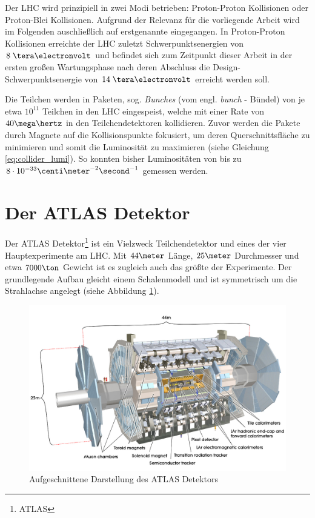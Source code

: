 Der \ac{LHC} wird prinzipiell in zwei Modi betrieben: Proton-Proton Kollisionen
oder Proton-Blei Kollisionen. Aufgrund der Relevanz für die vorliegende Arbeit
wird im Folgenden auschließlich auf erstgenannte eingegangen. In Proton-Proton
Kollisionen erreichte der \ac{LHC} zuletzt Schwerpunktsenergien von $8\TeV$ und
befindet sich zum Zeitpunkt dieser Arbeit in der ersten großen Wartungsphase
nach deren Abschluss die Design-Schwerpunktsenergie von $14\TeV$ erreicht
werden soll.

Die Teilchen werden in Paketen, sog. \textit{Bunches} (vom engl. \textit{bunch}
- Bündel) von je etwa $10^{11}$ Teilchen in den \ac{LHC} eingespeist, welche
mit einer Rate von $40\mega\hertz$ in den Teilchendetektoren kollidieren.
Zuvor werden die Pakete durch Magnete auf die Kollisionspunkte fokusiert, um
deren Querschnittsfläche zu minimieren und somit die Luminosität zu maximieren
(siehe Gleichung \ref{eq:collider_lumi}). So konnten bisher Luminositäten von
bis zu $8\cdot 10^{-33} \centi\meter^{-2}\second^{-1}$ gemessen werden.



%
\section{Der ATLAS Detektor}
\label{atlas_detector}


Der ATLAS Detektor\footnote{\acf{ATLAS}} ist ein Vielzweck Teilchendetektor und
eines der vier Hauptexperimente am \ac{LHC}. Mit $44\meter$ Länge, $25\meter$
Durchmesser und etwa $7000\ton$ Gewicht ist es zugleich auch das größte der
Experimente. Der grundlegende Aufbau gleicht einem Schalenmodell und ist
symmetrisch um die Strahlachse angelegt (siehe Abbildung \ref{fig:atlas}).

\begin{figure}
    \centering
    \includegraphics[width=1.0\textwidth]{img/atlas}
    \caption[Aufgeschnittene Darstellung des ATLAS Detektors]
        {Aufgeschnittene Darstellung des ATLAS Detektors}
    \label{fig:atlas}
\end{figure}

